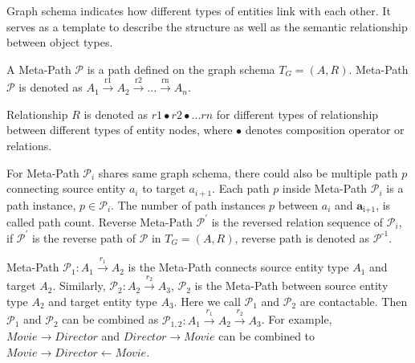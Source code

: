 Graph schema indicates how different types of entities link with each other. It serves as a template to describe the structure as well as the semantic relationship between object types.

\begin{definition}\label{def:metaPath}
A Meta-Path $\mathcal{P}$ is a path defined on the  graph schema $T_G = (A, R)$. \newline
Meta-Path $\mathcal{P}$ is denoted as $A_1 \xrightarrow{\text{r1}} A_2 \xrightarrow{\text{r2}} ... \xrightarrow{\text{rn}} A_n$. 

Relationship $R$ is denoted as $r1 \bullet r2 \bullet ... rn$ for different types of relationship between different types of entity nodes, where $\bullet $ denotes composition operator or relations.
\end{definition}

For Meta-Path $\mathcal{P}_i$ shares same graph schema, there could also be multiple path $p$ connecting source entity $a_i$ to target ${a}_{i+1}$. Each path $p$ inside Meta-Path $\mathcal{P}_i$ is a path instance, $p \in \mathcal{P}_i$. The number of path instances $p$ between $a_i$ and $\bm{a}_\text{i+1}$, is called path count. Reverse Meta-Path $\mathcal{P}^{'}$ is the reversed relation sequence of $\mathcal{P}_i$, if $\mathcal{P}^{'}$ is the reverse path of $\mathcal{P}$ in $T_G = (A, R)$, reverse path is denoted as $\mathcal{P}^\text{-1}$. \newline

Meta-Path $\mathcal{P}_1: A_1 \xrightarrow{r_1} A_2$ is the Meta-Path connects source entity type $A_1$ and target $A_2$.
Similarly, $\mathcal{P}_2: A_2 \xrightarrow{r_2} A_3$, $\mathcal{P}_2$ is the Meta-Path between source entity type $A_\text{2}$ and target entity type $A_\text{3}$.
Here we call $\mathcal{P}_1$ and $\mathcal{P}_2$ are contactable. Then $\mathcal{P}_1$ and $\mathcal{P}_2$ can be combined as $\mathcal{P}_{1,2}: A_1 \xrightarrow{r_1} A_2 \xrightarrow{r_2} A_3$. For example, $Movie \rightarrow Director$ and $Director \rightarrow Movie$ can be combined to $Movie \rightarrow Director \leftarrow Movie$. 
